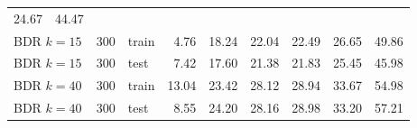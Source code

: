 \begin{table}[ht]
\begin{tabular}{lrrlrrrrrr}
  24.67 & 44.47 \\ 
  \multicolumn{2}{l}{BDR $k=15$} & 300 & train & 4.76 & 18.24 & 22.04 & 22.49 & 
  26.65 & 49.86 \\ 
  \multicolumn{2}{l}{BDR $k=15$} & 300 & test & 7.42 & 17.60 & 21.38 & 21.83 & 
  25.45 & 45.98 \\ 
  \multicolumn{2}{l}{BDR $k=40$} & 300 & train & 13.04 & 23.42 & 28.12 & 28.94 
  & 33.67 & 54.98 \\ 
  \multicolumn{2}{l}{BDR $k=40$} & 300 & test & 8.55 & 24.20 & 28.16 & 28.98 & 
  33.20 & 57.21 \\ 
  \bottomrule
\end{tabular}
\end{table}